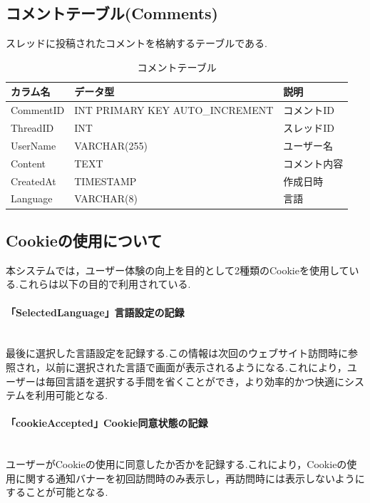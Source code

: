 \documentclass[b5paper,12pt,dvipdfmx]{jsreport}
\begin{document}
\subsection*{コメントテーブル(Comments)}

スレッドに投稿されたコメントを格納するテーブルである.

\begin{table}[H]
    \centering
    \caption{コメントテーブル}
    \begin{tabular}{|l|l|l|}
        \hline
        \textbf{カラム名} & \textbf{データ型} & \textbf{説明} \\
        \hline
        CommentID  & INT PRIMARY KEY AUTO\_INCREMENT & コメントID \\
        ThreadID   & INT & スレッドID \\
        UserName   & VARCHAR(255) & ユーザー名 \\
        Content    & TEXT & コメント内容 \\
        CreatedAt  & TIMESTAMP & 作成日時 \\
        Language   & VARCHAR(8) & 言語 \\
        \hline
    \end{tabular}
\end{table}

\subsection*{Cookieの使用について}

本システムでは，ユーザー体験の向上を目的として2種類のCookieを使用している.これらは以下の目的で利用されている.

\paragraph{「SelectedLanguage」言語設定の記録}\mbox{}\\
最後に選択した言語設定を記録する.この情報は次回のウェブサイト訪問時に参照され，以前に選択された言語で画面が表示されるようになる.これにより，ユーザーは毎回言語を選択する手間を省くことができ，より効率的かつ快適にシステムを利用可能となる.

\paragraph{「cookieAccepted」Cookie同意状態の記録}\mbox{}\\
ユーザーがCookieの使用に同意したか否かを記録する.これにより，Cookieの使用に関する通知バナーを初回訪問時のみ表示し，再訪問時には表示しないようにすることが可能となる.
\end{document}
